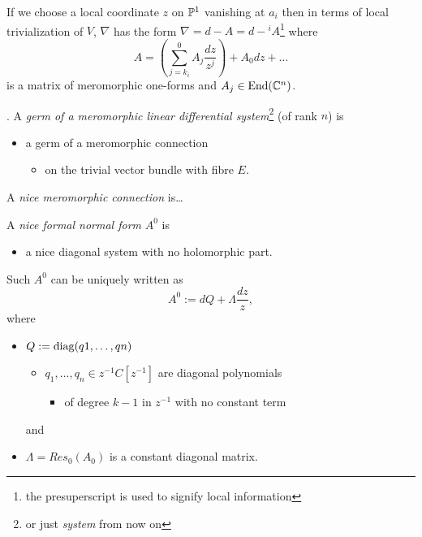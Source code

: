\begin{paracol}{2}\sloppy
\switchcolumn[0]\noindent
  If we choose a local coordinate $z$ on $\P^1$ vanishing at $a_i$ then in
  terms of local trivialization of $V$, $\nabla$ has the form
  $\nabla=d-A=d-{}^iA$\footnote{the presuperscript is used to signify local
  information} where
  \[
    A=\left(\sum^{0}_{j=k_i}A_j\frac{dz}{z^{j}}\right)+A_0dz+\dots
  \]
  is a matrix of meromorphic one-forms and $A_j\in\End(\C^n)$.
\switchcolumn[1]\noindent
  \begin{defn}
    \cite[Def 1.5]{thboalch}.
    A \emph{germ of a meromorphic linear differential system}\footnote{or just
    \emph{system} from now on} (of rank $n$) is
    \begin{itemize}
      \item a germ of a meromorphic connection
        \begin{itemize}
          \item on the trivial vector bundle with fibre $E$.
        \end{itemize}
    \end{itemize}
  \end{defn}
\end{paracol}
\begin{paracol}{2}\sloppy
\switchcolumn[0]\noindent
\begin{defn}
  A \emph{nice meromorphic connection} is\dots 
\end{defn}
\switchcolumn[1]\noindent
  \begin{defn}
    A \emph{nice formal normal form} $A^0$ is
    \begin{itemize}
      \item a nice diagonal system with no holomorphic part.
    \end{itemize}
    \begin{rem}
      Such $A^0$ can be uniquely written as
      \[
        A^0:= dQ + \Lambda \frac{dz}{z},
      \]
      where
      \begin{itemize}
        \item $Q := \diag(q1,\dots ,qn)$
          \begin{itemize}
            \item $q_1,\dots ,q_n\in z^{-1}C[z^{-1}]$ are diagonal polynomials
              \begin{itemize}
                \item of degree $k-1$ in $z^{-1}$ with no constant term
              \end{itemize}
          \end{itemize}
          and
        \item $\Lambda = Res_0(A_0)$ is a constant diagonal matrix.
      \end{itemize}
    \end{rem}
  \end{defn}
\end{paracol}
